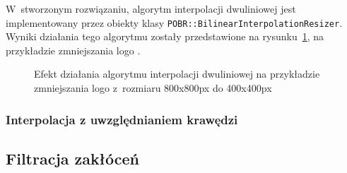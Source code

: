 W~stworzonym rozwiązaniu, algorytm interpolacji dwuliniowej jest implementowany przez  obiekty klasy \texttt{POBR::BilinearInterpolationResizer}. Wyniki działania tego algorytmu zostały przedstawione na rysunku~\ref{fig:bilinear-result}, na przykładzie zmniejszania logo \bk. 
\begin{figure}%
    \centering
    \qquad
    \qquad
    \caption{Efekt działania algorytmu interpolacji dwuliniowej na przykładzie zmniejszania logo \bk z~rozmiaru 800x800px do 400x400px}%
    \label{fig:bilinear-result}%
\end{figure}

\subsubsection{Interpolacja z uwzględnianiem krawędzi}

\subsection{Filtracja zakłóceń}
